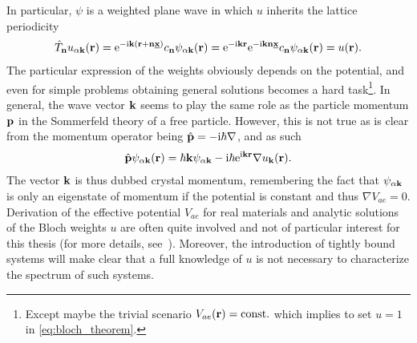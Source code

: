 In particular, $\psi$ is a weighted plane wave in which $u$ inherits the lattice periodicity
\begin{align}
    \hat T_{\bf n} u_{\alpha{\bf k}}({\bf r})
    =
    \mathrm e^{-\mathrm i{\bf k}\left( {\bf r}+{\bf n}\underline{\bf x} \right)}c_{\bf n}\psi_{\alpha{\bf k}}({\bf r})
    =
    \mathrm e^{-\mathrm i{\bf k}{\bf r}}\mathrm e^{-\mathrm i{\bf k}{\bf n}\underline{\bf x}}c_{\bf n}\psi_{\alpha{\bf k}}({\bf r})
    =
    u({\bf r}).
\end{align}
The particular expression of the weights obviously depends on the potential, and even for simple problems obtaining general solutions becomes a hard task\footnote{Except maybe the trivial scenario $V_{ae}({\bf r})={\rm const.}$ which implies to set $u=1$ in \cref{eq:bloch_theorem}.}.
In general, the wave vector $\bf k$ seems to play the same role as the particle momentum $\bf p$ in the Sommerfeld theory of a free particle.
However, this is not true as is clear from the momentum operator being $\hat{\bf p}=-\mathrm i\hbar\nabla$, and as such
\begin{align}
  \hat{\bf p}\psi_{\alpha{\bf k}}({\bf r}) = \hbar{\bf k}\psi_{\alpha{\bf k}} - \mathrm i\hbar\mathrm e^{\mathrm i{\bf k}{\bf r}}\nabla u_{\bf k}(\bf r).
\end{align}
The vector ${\bf k}$ is thus dubbed crystal momentum, remembering the fact that $\psi_{\alpha{\bf k}}$ is only an eigenstate of momentum if the potential is constant and thus $\nabla V_{ae}=0$.
Derivation of the effective potential $V_{ae}$ for real materials and analytic solutions of the Bloch weights $u$ are often quite involved and not of particular interest for this thesis (for more details, see~\cite{AshcroftMermin1978,Czycholl2016}).
Moreover, the introduction of tightly bound systems will make clear that a full knowledge of $u$ is not necessary to characterize the spectrum of such systems.
\\

